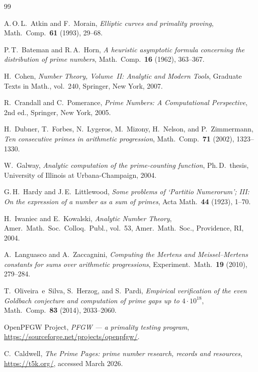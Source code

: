 \documentclass[11pt,a4paper]{article}
\theoremstyle{plain}
\theoremstyle{definition}
\theoremstyle{remark}
\begin{document}
\begin{thebibliography}{99}

A.\,O.\,L.~Atkin and F.~Morain,
\emph{Elliptic curves and primality proving},
Math.\ Comp.\ \textbf{61} (1993), 29--68.

P.\,T.~Bateman and R.\,A.~Horn,
\emph{A heuristic asymptotic formula concerning the distribution of prime numbers},
Math.\ Comp.\ \textbf{16} (1962), 363--367.

H.~Cohen,
\emph{Number Theory, Volume~II: Analytic and Modern Tools},
Graduate Texts in Math., vol.~240, Springer, New York, 2007.

R.~Crandall and C.~Pomerance,
\emph{Prime Numbers: A Computational Perspective},
2nd ed., Springer, New York, 2005.

H.~Dubner, T.~Forbes, N.~Lygeros, M.~Mizony, H.~Nelson, and P.~Zimmermann,
\emph{Ten consecutive primes in arithmetic progression},
Math.\ Comp.\ \textbf{71} (2002), 1323--1330.

W.~Galway,
\emph{Analytic computation of the prime-counting function},
Ph.\,D.\ thesis, University of Illinois at Urbana-Champaign, 2004.

G.\,H.~Hardy and J.\,E.~Littlewood,
\emph{Some problems of `Partitio Numerorum'; III: On the expression of a number as a sum of primes},
Acta Math.\ \textbf{44} (1923), 1--70.

H.~Iwaniec and E.~Kowalski,
\emph{Analytic Number Theory},
Amer.\ Math.\ Soc.\ Colloq.\ Publ., vol.~53, Amer.\ Math.\ Soc., Providence, RI, 2004.

A.~Languasco and A.~Zaccagnini,
\emph{Computing the Mertens and Meissel--Mertens constants for sums over arithmetic progressions},
Experiment.\ Math.\ \textbf{19} (2010), 279--284.

T.~Oliveira~e~Silva, S.~Herzog, and S.~Pardi,
\emph{Empirical verification of the even Goldbach conjecture and computation of prime gaps up to $4 \cdot 10^{18}$},
Math.\ Comp.\ \textbf{83} (2014), 2033--2060.

OpenPFGW Project,
\emph{PFGW --- a primality testing program},
\url{https://sourceforge.net/projects/openpfgw/}.

C.~Caldwell,
\emph{The Prime Pages: prime number research, records and resources},
\url{https://t5k.org/}, accessed March 2026.


\end{thebibliography}
\end{document}
